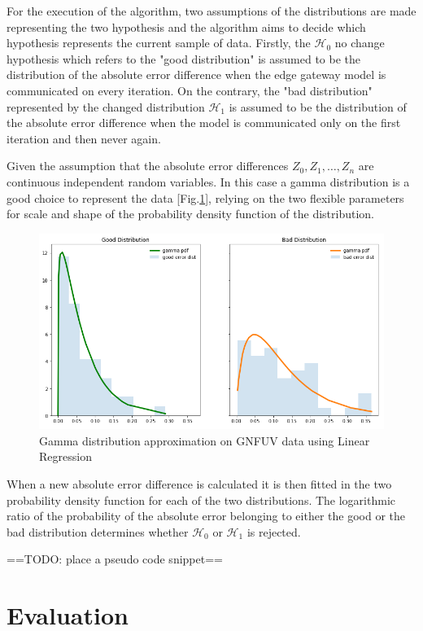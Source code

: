 \documentclass{mpaper}
\begin{document}
For the execution of the algorithm, two assumptions of the distributions are made representing the two hypothesis and the algorithm aims to decide which hypothesis represents the current sample of data. 
Firstly, the $\mathcal{H}_0$ no change hypothesis which refers to the "good distribution" is assumed to be the distribution of the absolute error difference when the edge gateway model is communicated on every iteration. On the contrary, the "bad distribution" represented by the changed distribution $\mathcal{H}_1$ is assumed to be the distribution of the absolute error difference when the model is communicated only on the first iteration and then never again.

Given the assumption that the absolute error differences $Z_0, Z_1, \dotsc , Z_n $ are continuous independent random variables. In this case a gamma distribution is a good choice to represent the data  [Fig.\ref{fig:goodvsbad}], relying on the two flexible parameters for scale and shape of the probability density function of the distribution.

\begin{figure}[h]
    \centering
    \includegraphics[scale=0.3]{imgs/goodVSbad.png}
    \caption{Gamma distribution approximation on GNFUV data using Linear Regression}
    \label{fig:goodvsbad}
\end{figure}

When a new absolute error difference is calculated it is then fitted in the two probability density function for each of the two distributions. The logarithmic ratio of the probability of the absolute error belonging to either the good or the bad distribution determines whether $\mathcal{H}_0$ or $\mathcal{H}_1$ is rejected.

==TODO: place a pseudo code snippet==

\section{Evaluation}
\end{document}

